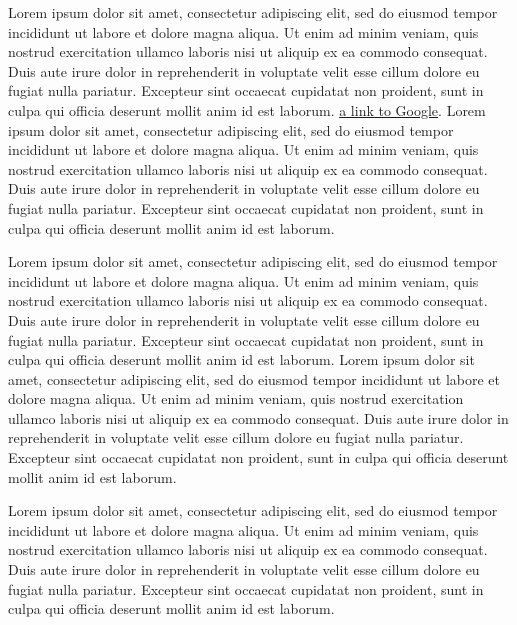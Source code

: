 \documentclass[12pt,sigleft,dateno,stdletter]{newlfm}
\begin{document}
\begin{newlfm}

Lorem ipsum dolor sit amet, consectetur adipiscing elit, sed do eiusmod tempor incididunt ut labore et dolore magna aliqua.
Ut enim ad minim veniam, quis nostrud exercitation ullamco laboris nisi ut aliquip ex ea commodo consequat. 
Duis aute irure dolor in reprehenderit in voluptate velit esse cillum dolore eu fugiat nulla pariatur. 
Excepteur sint occaecat cupidatat non proident, sunt in culpa qui officia deserunt mollit anim id est laborum. 
\href{https://www.google.com/}{a link to Google}. 
Lorem ipsum dolor sit amet, consectetur adipiscing elit, sed do eiusmod tempor incididunt ut labore et dolore magna aliqua.
Ut enim ad minim veniam, quis nostrud exercitation ullamco laboris nisi ut aliquip ex ea commodo consequat. 
Duis aute irure dolor in reprehenderit in voluptate velit esse cillum dolore eu fugiat nulla pariatur. 
Excepteur sint occaecat cupidatat non proident, sunt in culpa qui officia deserunt mollit anim id est laborum. 

Lorem ipsum dolor sit amet, consectetur adipiscing elit, sed do eiusmod tempor incididunt ut labore et dolore magna aliqua.
Ut enim ad minim veniam, quis nostrud exercitation ullamco laboris nisi ut aliquip ex ea commodo consequat. 
Duis aute irure dolor in reprehenderit in voluptate velit esse cillum dolore eu fugiat nulla pariatur. 
Excepteur sint occaecat cupidatat non proident, sunt in culpa qui officia deserunt mollit anim id est laborum. Lorem ipsum dolor sit amet, consectetur adipiscing elit, sed do eiusmod tempor incididunt ut labore et dolore magna aliqua.
Ut enim ad minim veniam, quis nostrud exercitation ullamco laboris nisi ut aliquip ex ea commodo consequat. 
Duis aute irure dolor in reprehenderit in voluptate velit esse cillum dolore eu fugiat nulla pariatur. 
Excepteur sint occaecat cupidatat non proident, sunt in culpa qui officia deserunt mollit anim id est laborum. 

Lorem ipsum dolor sit amet, consectetur adipiscing elit, sed do eiusmod tempor incididunt ut labore et dolore magna aliqua.
Ut enim ad minim veniam, quis nostrud exercitation ullamco laboris nisi ut aliquip ex ea commodo consequat. 
Duis aute irure dolor in reprehenderit in voluptate velit esse cillum dolore eu fugiat nulla pariatur. 
Excepteur sint occaecat cupidatat non proident, sunt in culpa qui officia deserunt mollit anim id est laborum. 


\end{newlfm}
\end{document}
